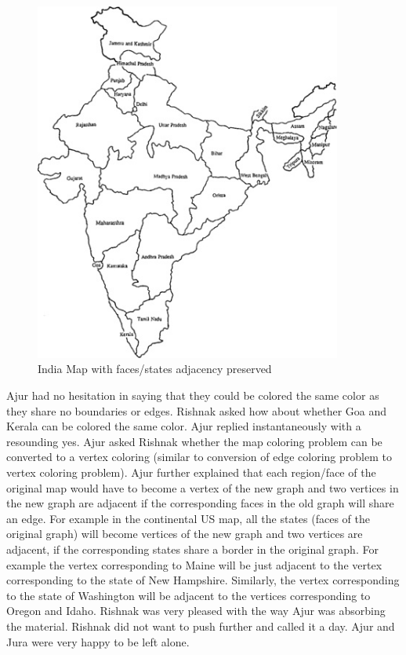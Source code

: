 \begin{figure}
\begin{center}
\includegraphics[width=0.9\textwidth]{MapIndia.jpg}
\end{center}
\caption{India Map with faces/states adjacency preserved}\label{10g10}
\end{figure}

Ajur had no hesitation in saying that they could be colored the same color as they share no boundaries or edges. Rishnak asked how about whether Goa and Kerala can be colored the same color. Ajur replied instantaneously with a resounding yes. Ajur asked Rishnak whether the map coloring problem can be converted to a vertex coloring (similar to conversion of edge coloring problem to vertex coloring problem). Ajur further explained that each region/face of the original map would have to become a vertex of the new graph and two vertices in the new graph are adjacent if the corresponding faces in the old graph will share an edge. For example in the continental US map, all the states (faces of the original graph) will become vertices of the new graph and two vertices are adjacent, if the corresponding states share a border in the original graph. For example the vertex corresponding to Maine will be just adjacent to the vertex corresponding to the state of New Hampshire. Similarly, the vertex corresponding to the state of Washington will be adjacent to the vertices corresponding to Oregon and Idaho. Rishnak was very pleased with the way Ajur was absorbing the material. Rishnak did not want to push further and called it a day. Ajur and Jura were very happy to be left alone. 